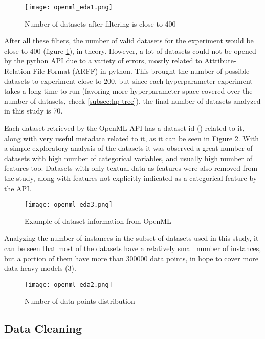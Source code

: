 \begin{figure}[!h]
    \centering
    \texttt{[image: openml\_eda1.png]} 
    \caption{Number of datasets after filtering is close to 400}
    \label{fig:openml-eda1}
\end{figure}

After all these filters, the number of valid datasets for the experiment would be close to 400 (figure \ref{fig:openml-eda1}), in theory. However, a lot of datasets could not be opened by the python API due to a variety of errors, mostly related to Attribute-Relation File Format (ARFF) in python. This brought the number of possible datasets to experiment close to $200$, but since each hyperparameter experiment takes a long time to run (favoring more hyperparameter space covered over the number of datasets, check \ref{subsec:hp-tree}), the final number of datasets analyzed in this study is 70.


Each dataset retrieved by the OpenML API has a dataset id () related to it, along with very useful metadata related to it, as it can be seen in Figure \ref{fig:openml-eda3}. With a simple exploratory analysis of the datasets it was observed a great number of datasets with high number of categorical variables, and usually high number of features too. Datasets with only textual data as features were also removed from the study, along with features not explicitly indicated as a categorical feature by the API.

\begin{figure}[!h]
    \centering
    \texttt{[image: openml\_eda3.png]} 
    \caption{Example of dataset information from OpenML}
    \label{fig:openml-eda3}
\end{figure}

Analyzing the number of instances in the subset of datasets used in this study, it can be seen that most of the datasets have a relatively small number of instances, but a portion of them have more than $300000$ data points, in hope to cover more data-heavy models (\ref{fig:openml-eda2}).

\begin{figure}[!h]
    \centering
    \texttt{[image: openml\_eda2.png]} 
    \caption{Number of data points distribution}
    \label{fig:openml-eda2}
\end{figure}

\newpage

\subsection{Data Cleaning}

